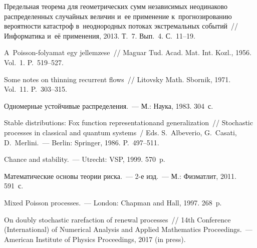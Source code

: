 \begin{multicols}{2}


{\small\frenchspacing
 {%
 \begin{thebibliography}{99}
    
 Предель\-ная теорема
    для геометрических сумм неза\-ви\-симых неодинаково распределенных
    случайных ве\-личин и~ее применение к~прогнозированию вероятности
    катастроф в~неоднородных потоках экстремальных событий~//
    Информатика и~её применения, 2013. Т.~7. Вып.~4. С.~11--19.
    
 A~Poisson-folyamat egy jellemzese~// Maguar Tud. Acad.
    Mat. Int. Kozl., 1956. Vol.~1. P.~519--527.
    
 Some notes on thinning recurrent flows~// 
Litovsky Math. Sbornik, 1971. Vol.~11. P.~303--315.
    
 Одномерные устойчивые распределения.~--- М.: Наука, 1983. 304~с.
    
 Stable distributions: Fox
    function representationand generalization~// 
    Stochastic processes in classical and quantum systems~/ 
    Eds. S.~Albeverio, G.~Casati, D.~Merlini.~--- Berlin: Springer, 1986. P.~497--511.
    
    Chance and stability.~--- Utrecht: VSP, 1999. 570~p.
    
 Математические
        основы теории риска.~--- 2-е изд.~--- М.: Физматлит, 2011. 591~с.
    
     Mixed Poisson processes.~--- London: Chapman and Hall,
    1997. 268~p.
    
 On doubly
    stochastic rarefaction of renewal processes~// 14th 
     Conference (International) of Numerical Analysis and Applied
    Mathematics Proceedings.~---
    American Institute of Physics Proceedings, 2017 (in press).
    

\end{thebibliography}}}
\end{multicols}
